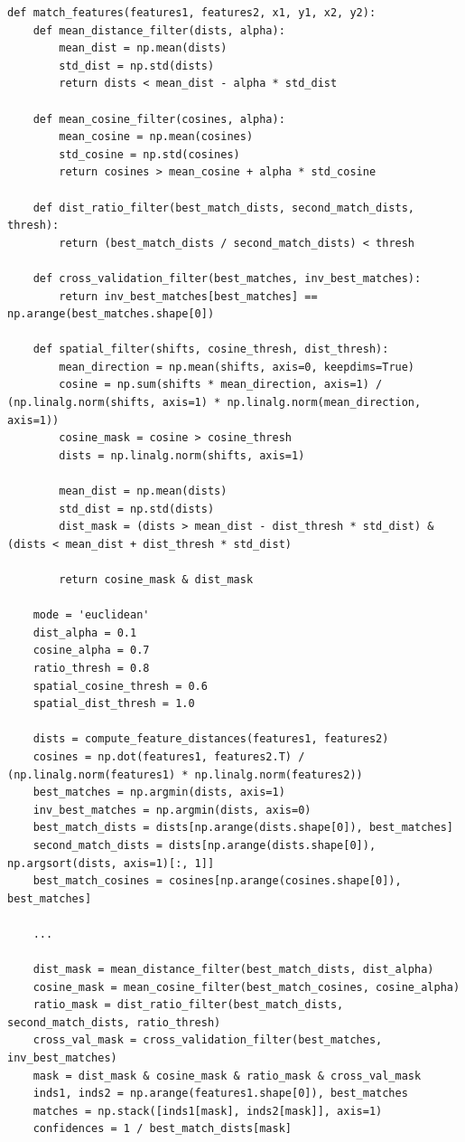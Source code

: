 \begin{lstlisting}[style=Python]
def match_features(features1, features2, x1, y1, x2, y2):
    def mean_distance_filter(dists, alpha):
        mean_dist = np.mean(dists)
        std_dist = np.std(dists)
        return dists < mean_dist - alpha * std_dist
    
    def mean_cosine_filter(cosines, alpha):
        mean_cosine = np.mean(cosines)
        std_cosine = np.std(cosines)
        return cosines > mean_cosine + alpha * std_cosine
    
    def dist_ratio_filter(best_match_dists, second_match_dists, thresh):
        return (best_match_dists / second_match_dists) < thresh
    
    def cross_validation_filter(best_matches, inv_best_matches):
        return inv_best_matches[best_matches] == np.arange(best_matches.shape[0])
    
    def spatial_filter(shifts, cosine_thresh, dist_thresh):
        mean_direction = np.mean(shifts, axis=0, keepdims=True)
        cosine = np.sum(shifts * mean_direction, axis=1) / (np.linalg.norm(shifts, axis=1) * np.linalg.norm(mean_direction, axis=1))
        cosine_mask = cosine > cosine_thresh
        dists = np.linalg.norm(shifts, axis=1)

        mean_dist = np.mean(dists)
        std_dist = np.std(dists)
        dist_mask = (dists > mean_dist - dist_thresh * std_dist) & (dists < mean_dist + dist_thresh * std_dist)

        return cosine_mask & dist_mask
    
    mode = 'euclidean'
    dist_alpha = 0.1
    cosine_alpha = 0.7
    ratio_thresh = 0.8
    spatial_cosine_thresh = 0.6
    spatial_dist_thresh = 1.0
    
    dists = compute_feature_distances(features1, features2)
    cosines = np.dot(features1, features2.T) / (np.linalg.norm(features1) * np.linalg.norm(features2))
    best_matches = np.argmin(dists, axis=1)
    inv_best_matches = np.argmin(dists, axis=0)
    best_match_dists = dists[np.arange(dists.shape[0]), best_matches]
    second_match_dists = dists[np.arange(dists.shape[0]), np.argsort(dists, axis=1)[:, 1]]
    best_match_cosines = cosines[np.arange(cosines.shape[0]), best_matches]

    ...

    dist_mask = mean_distance_filter(best_match_dists, dist_alpha)
    cosine_mask = mean_cosine_filter(best_match_cosines, cosine_alpha)
    ratio_mask = dist_ratio_filter(best_match_dists, second_match_dists, ratio_thresh)
    cross_val_mask = cross_validation_filter(best_matches, inv_best_matches)
    mask = dist_mask & cosine_mask & ratio_mask & cross_val_mask
    inds1, inds2 = np.arange(features1.shape[0]), best_matches
    matches = np.stack([inds1[mask], inds2[mask]], axis=1)
    confidences = 1 / best_match_dists[mask]


\end{lstlisting}
